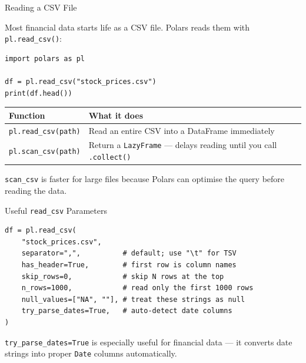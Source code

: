\documentclass[9pt,aspectratio=169]{beamer}
\newcommand{\py}[1]{\lstinline[language=Python]{#1}}
\begin{document}
\begin{frame}[fragile]{Reading a CSV File}

Most financial data starts life as a CSV file. Polars reads them with \py{pl.read_csv()}:

\begin{lstlisting}
import polars as pl

df = pl.read_csv("stock_prices.csv")
print(df.head())
\end{lstlisting}

\medskip

\begin{tabular}{@{}lp{7.5cm}@{}}
\toprule
\textbf{Function} & \textbf{What it does} \\
\midrule
\py{pl.read_csv(path)} & Read an entire CSV into a DataFrame immediately \\[0.3em]
\py{pl.scan_csv(path)} & Return a \texttt{LazyFrame} --- delays reading until you call \py{.collect()} \\
\bottomrule
\end{tabular}

\bigskip

\begin{highlightbox}
\centering
\texttt{scan\_csv} is faster for large files because Polars can optimise the query before reading the data.
\end{highlightbox}

\end{frame}


\begin{frame}[fragile]{Useful \texttt{read\_csv} Parameters}

\begin{lstlisting}
df = pl.read_csv(
    "stock_prices.csv",
    separator=",",          # default; use "\t" for TSV
    has_header=True,        # first row is column names
    skip_rows=0,            # skip N rows at the top
    n_rows=1000,            # read only the first 1000 rows
    null_values=["NA", ""], # treat these strings as null
    try_parse_dates=True,   # auto-detect date columns
)
\end{lstlisting}

\medskip

\begin{highlightbox}
\centering
\texttt{try\_parse\_dates=True} is especially useful for financial data --- it converts date strings into proper \texttt{Date} columns automatically.
\end{highlightbox}

\end{frame}
\end{document}
